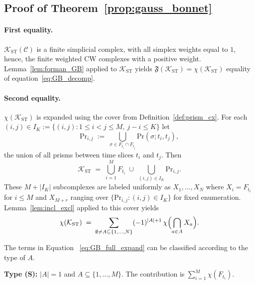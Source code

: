 \documentclass[
    pre,
    twocolumn,
    superscriptaddress,
    showpacs,
    nofootinbib,
    amsmath,
    amssymb,
    floatfix
]{revtex4-2}
\newcommand{\K}{\mathcal{K}}
\theoremstyle{plain} %
\theoremstyle{definition} %
\begin{document}
\subsection{Proof of Theorem~\ref{prop:gauss_bonnet}}\label{app:GB_proof}

\paragraph{First equality.}
$\K_{\mathrm{ST}}(\mathcal{C})$ is a finite simplicial complex, with
all simplex weights equal to $1$, hence, the finite
weighted CW complexes with a positive weight.
Lemma~\ref{lem:forman_GB} applied to $\K_{\mathrm{ST}}$ yields
$\mathfrak{F}(\K_{\mathrm{ST}}) = \chi(\K_{\mathrm{ST}})$
equality of equation~\eqref{eq:GB_decomp}.

\paragraph{Second equality.}
$\chi(\K_{\mathrm{ST}})$ is expanded using the cover from
Definition~\ref{def:prism_cx}.
For each $(i, j) \in I_K := \{(i, j) : 1 \le i < j \le M,\ j - i \le K\}$
let
\begin{equation*}
    \mathrm{Pr}_{i,j}
    \;:=\;
    \bigcup_{\sigma \in F_{t_i} \cap F_{t_j}}
        \mathrm{Pr}(\sigma; t_i, t_j),
\end{equation*}
the union of all prisms between time slices $t_i$ and $t_j$.
Then
\begin{equation*}\label{eq:cover}
    \K_{\mathrm{ST}}
    \;=\;
    \bigcup_{i=1}^{M} F_{t_i}
    \;\cup\;
    \bigcup_{(i,j) \in I_K} \mathrm{Pr}_{i,j}.
\end{equation*}
These $M + |I_K|$ subcomplexes are labeled uniformly as $X_1, \ldots, X_N$
where $X_i = F_{t_i}$ for $i \le M$ and $X_{M + r}$ ranging over
$\{\mathrm{Pr}_{i,j} : (i,j) \in I_K\}$ for fixed enumeration.
Lemma~\ref{lem:incl_excl} applied to this cover yields
\begin{equation}\label{eq:GB_full_expand}
    \chi(\K_{\mathrm{ST}})
    \;=\;
    \sum_{\emptyset \neq A \subseteq \{1,\ldots,N\}}
        (-1)^{|A|+1}\,
        \chi\Bigl(\bigcap_{a \in A} X_a\Bigr).
\end{equation}

The terms in Equation ~\eqref{eq:GB_full_expand} can be classified according to the type of
$A$.

\textbf{Type (S):} $|A| = 1$ and $A \subseteq \{1, \ldots, M\}$.
The contribution is $\sum_{i=1}^{M} \chi(F_{t_i})$.
\end{document}
